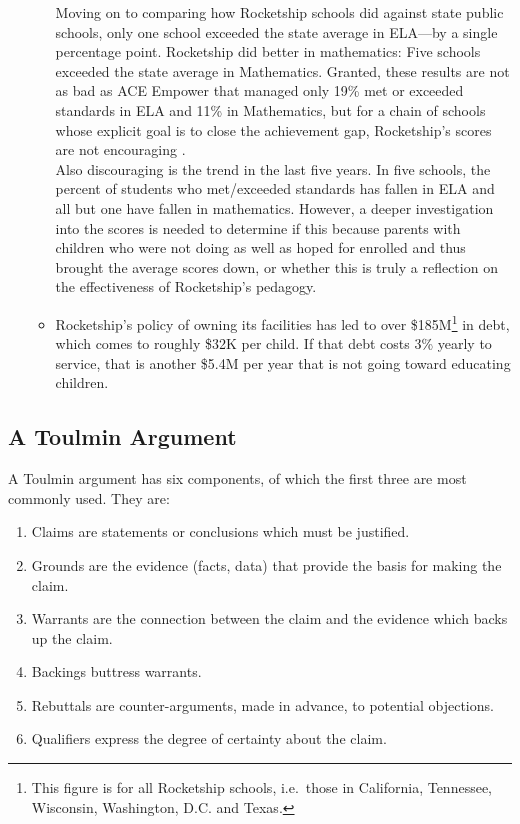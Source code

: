 \begin{enumerate}[topsep=0.3\baselineskip,itemsep=0.25\baselineskip,resume]
\begin{itemize}
      Moving on to comparing how Rocketship schools did against state public schools, only one school exceeded the state average in ELA—by a single percentage point. Rocketship did better in mathematics: Five schools exceeded the state average in Mathematics. Granted, these results are not as bad as ACE Empower that managed only 19\% met or exceeded standards in ELA and 11\% in Mathematics, but for a chain of schools whose explicit goal is to close the achievement gap, Rocketship's scores are not encouraging \parencite{SCCOE2014}.\\
      Also discouraging is the trend in the last five years. In five schools, the percent of students who met/exceeded standards has fallen in ELA and all but one have fallen in mathematics. However, a deeper investigation into the scores is needed to determine if this because parents with children who were not doing as well as hoped for enrolled and thus brought the average scores down, or whether this is truly a reflection on the effectiveness of Rocketship's pedagogy.
      \item Rocketship's policy of owning its facilities has led to over \$185M\footnote{This figure is for all Rocketship schools, i.e.\ those in  California, Tennessee, Wisconsin, Washington, D.C. and Texas.} in debt, which comes to roughly \$32K per child. If that debt costs 3\% yearly to service, that is another \$5.4M per year that is not going toward educating children.
    \end{itemize}
\end{enumerate}

\subsection{A Toulmin Argument}%
\label{sec:toulmin-arguments}\indent%
A Toulmin argument has six components, of which the first three are most commonly used. They are:

\begin{enumerate}[topsep=0.3\baselineskip,itemsep=0.25\baselineskip]
  \item Claims are statements or conclusions which must be justified.
  \item Grounds are the evidence (facts, data) that provide the basis for making the claim.
  \item Warrants are the connection between the claim and the evidence which backs up the claim.
  \item Backings buttress warrants.
  \item Rebuttals are counter-arguments, made in advance, to potential objections.
  \item Qualifiers express the degree of certainty about the claim.
\end{enumerate}

